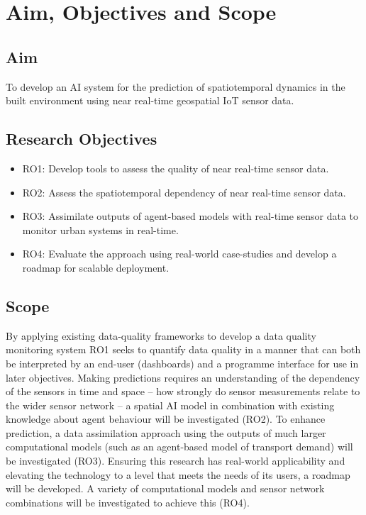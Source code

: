 \section{Aim, Objectives and Scope}

\subsection{Aim}
To develop an AI system for the prediction of spatiotemporal dynamics in the built environment using near real-time geospatial IoT sensor data.


\subsection{Research Objectives}
\begin{itemize}
    \item RO1: Develop tools to assess the quality of near real-time sensor data.
    \item RO2: Assess the spatiotemporal dependency of near real-time sensor data.
    \item RO3: Assimilate outputs of agent-based models with real-time sensor data to monitor urban systems in real-time.
    \item RO4: Evaluate the approach using real-world case-studies and develop a roadmap for scalable deployment.
\end{itemize}


\subsection{Scope}
By applying existing data-quality frameworks to develop a data quality monitoring system RO1 seeks to quantify data quality in a manner that can both be interpreted by an end-user (dashboards) and a programme interface for use in later objectives. Making predictions requires an understanding of the dependency of the sensors in time and space – how strongly do sensor measurements relate to the wider sensor network – a spatial AI model in combination with existing knowledge about agent behaviour will be investigated (RO2). To enhance prediction, a data assimilation approach using the outputs of much larger computational models (such as an agent-based model of transport demand) will be investigated (RO3). Ensuring this research has real-world applicability and elevating the technology to a level that meets the needs of its users, a roadmap will be developed. A variety of computational models and sensor network combinations will be investigated to achieve this (RO4).

